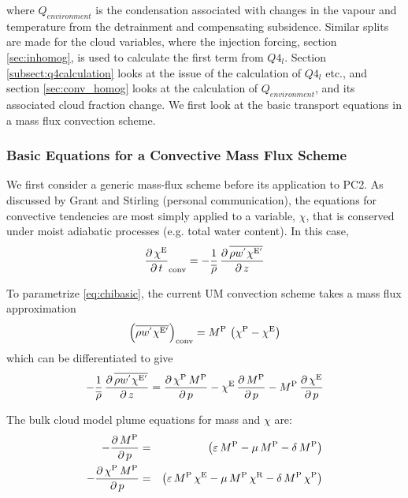 \documentclass{UMDP_article}
\newcommand{\xsubsup}[2]{\ensuremath{{\chi}_{\rm{#1}}^{\rm{#2}}}}
\newcommand{\ov}{\overline}
\newcommand{\lp}{\left(}
\newcommand{\rp}{\right)}
\newcommand{\pardbyd}[2]{\ensuremath{\frac{\partial \, #1}{\partial \, #2}}}
\begin{document}
where $Q_{environment}$ is the condensation associated with changes
in the vapour and temperature from the detrainment and compensating
subsidence. Similar splits are made for the cloud variables, where
the injection forcing, section \ref{sec:inhomog}, is used to calculate
the first term from $Q4_l$. Section \ref{subsect:q4calculation} looks
at the issue of the
calculation of $Q4_l$ etc., and section \ref{sec:conv_homog} looks at
the calculation of $Q_{environment}$, and its associated cloud
fraction change. We first look at the basic transport equations in a
mass flux convection scheme.

\subsubsection{Basic Equations for a Convective Mass Flux Scheme}
\label{subsect:basmaseqs}

We first consider a generic mass-flux scheme before its application to PC2.
As discussed by Grant and Stirling (personal communication),
the equations for convective
tendencies are most simply applied to a variable, ${\chi}$, that is conserved
under moist adiabatic processes (e.g. total water content). In this case,
%
\begin{equation}
{\pardbyd{\xsubsup{ }{E}}{t}}_{\rm{conv}} = 
- \frac{1}{\ov{\rho}} \, \pardbyd{\ov{\rho w^{'} \xsubsup{ }{E'}}}{z} 
\label{eq:chibasic} \end{equation}

To parametrize \ref{eq:chibasic}, the current UM convection scheme takes a
mass flux approximation 
%
\begin{equation}
\lp {\ov{\rho w^{'} \xsubsup{ }{E'}}} \rp_{\rm{conv}} = M^{\rm{P}} \, 
\lp { \xsubsup{ }{P} - \xsubsup{ }{E} } \rp
\label{eq:massflux} \end{equation}
%
which can be differentiated to give
%
\begin{equation}
- \frac{1}{\ov{\rho}} \, \pardbyd{\ov{\rho w^{'} \xsubsup{ }{E'}}}{z} =
\pardbyd{\xsubsup{ }{P} \, M^{\rm{P}}}{p} - 
\xsubsup{ }{E} \,  \pardbyd{M^{\rm{P}}}{p} -   
M^{\rm{P}} \, \pardbyd{\xsubsup{ }{E}}{p}  
\label{eq:eddyflux} \end{equation}

The bulk cloud model plume equations for mass and ${\chi}$ are:
%
\begin{eqnarray}
- \pardbyd{M^{\rm{P}}}{p} & = & 
\lp { \varepsilon \, M^{\rm{P}} - \mu \, M^{\rm{P}} - \delta \, M^{\rm{P}} } \rp
\label{eq:dbydpmassflux}  \\
- \pardbyd{\xsubsup{ }{P} \, M^{\rm{P}}}{p} & = & \lp { 
\varepsilon \, M^{\rm{P}} \, \xsubsup{ }{E}
- \mu \, M^{\rm{P}} \, \xsubsup{ }{R} - \delta \, M^{\rm{P}} \, \xsubsup{ }{P} 
} \rp  \label{eq:dbydpmfchi}  
\end{eqnarray}
\end{document}
